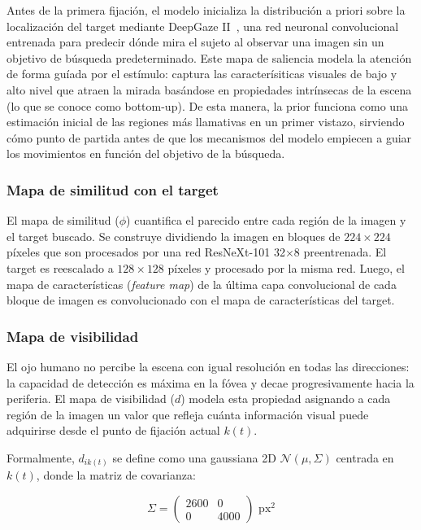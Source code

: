 Antes de la primera fijación, el modelo inicializa la distribución
a priori sobre la localización del target mediante DeepGaze II~\citep{kummerer2021}, una red neuronal convolucional entrenada para predecir dónde mira el sujeto al observar una imagen sin un objetivo de búsqueda predeterminado. Este mapa de saliencia modela la atención de forma guíada por el estímulo: captura las caracterísiticas visuales de bajo y alto nivel que atraen la mirada basándose en propiedades intrínsecas de la escena (lo que se conoce como bottom-up). De esta manera, la prior funciona como una estimación inicial de las regiones más llamativas en un primer vistazo, sirviendo cómo punto de partida antes de que los mecanismos del modelo empiecen a guiar los movimientos en función del objetivo de la búsqueda.

\subsubsection{Mapa de similitud con el target}

El mapa de similitud ($\phi$) cuantifica el parecido entre cada 
región de la imagen y el target buscado. Se construye dividiendo la 
imagen en bloques de $224 \times 224$ píxeles que son procesados por 
una red ResNeXt-101 32$\times$8 preentrenada. El target 
es reescalado a $128 \times 128$ píxeles y procesado por la misma red. 
Luego, el mapa de características (\textit{feature map}) de la última
capa convolucional de cada bloque de imagen es convolucionado con el 
mapa de características del target. 

\subsubsection{Mapa de visibilidad}

El ojo humano no percibe la escena con igual resolución en 
todas las direcciones: la capacidad de detección es máxima en la fóvea 
y decae progresivamente hacia la periferia. El mapa de visibilidad 
($d$) modela esta propiedad asignando a cada región de la imagen un 
valor que refleja cuánta información visual puede adquirirse desde el 
punto de fijación actual $k(t)$.

Formalmente, $d_{ik(t)}$ se define como una gaussiana 2D 
$\mathcal{N}(\mu, \Sigma)$ centrada en $k(t)$, donde la matriz de 
covarianza:

\begin{equation}
    \Sigma = \begin{pmatrix} 2600 & 0 \\ 0 & 4000 \end{pmatrix} 
    \text{ px}^2
\end{equation}

